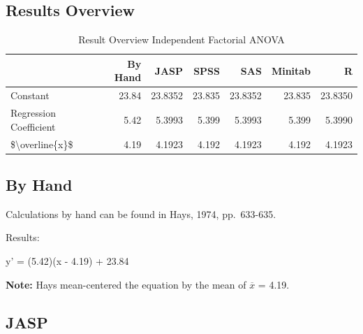 \documentclass[
]{book}
\begin{document}
\hypertarget{results-overview-1}{%
\subsection{Results Overview}\label{results-overview-1}}

\begin{table}

\caption{\label{tab:unnamed-chunk-90}Result Overview Independent Factorial ANOVA}
\centering
\begin{tabular}[t]{lrrrrrr}
\toprule
  & By Hand & JASP & SPSS & SAS & Minitab & R\\
\midrule
Constant & 23.84 & 23.8352 & 23.835 & 23.8352 & 23.835 & 23.8350\\
Regression Coefficient & 5.42 & 5.3993 & 5.399 & 5.3993 & 5.399 & 5.3990\\
\$\textbackslash{}overline\{x\}\$ & 4.19 & 4.1923 & 4.192 & 4.1923 & 4.192 & 4.1923\\
\bottomrule
\end{tabular}
\end{table}

\hypertarget{by-hand-1}{%
\subsection{By Hand}\label{by-hand-1}}

Calculations by hand can be found in Hays, 1974, pp.~633-635.

Results:

y' = (5.42)(x - 4.19) + 23.84

\textbf{Note:} Hays mean-centered the equation by the mean of \(\overline{x}\) = 4.19.

\hypertarget{jasp-1}{%
\subsection{JASP}\label{jasp-1}}
\end{document}
